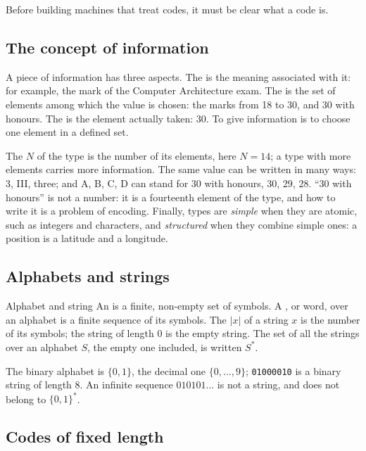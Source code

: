 Before building machines that treat codes, it must be clear what a code is.

\subsection{The concept of information}

A piece of information has three aspects. The  is the meaning
associated with it: for example, the mark of the Computer Architecture exam.
The  is the set of elements among which the value is chosen: the
marks from 18 to 30, and 30 with honours. The  is the element
actually taken: 30. To give information is to choose one element in a defined
set.

The  $N$ of the type is the number of its elements, here
$N=14$; a type with more elements carries more information. The same value
can be written in many ways: 3, III, three; and A, B, C, D can stand for 30
with honours, 30, 29, 28. ``30 with honours'' is not a number: it is a
fourteenth element of the type, and how to write it is a problem of encoding.
Finally, types are \emph{simple} when they are atomic, such as integers and
characters, and \emph{structured} when they combine simple ones: a position is
a latitude and a longitude.

\subsection{Alphabets and strings}

\begin{definition}{Alphabet and string}
An  is a finite, non-empty set of symbols. A , or
word, over an alphabet is a finite sequence of its symbols. The
 $|x|$ of a string $x$ is the number of its symbols; the string
of length 0 is the empty string. The set of all the strings over an alphabet
$S$, the empty one included, is written $S^{*}$.
\end{definition}

The binary alphabet is $\{0,1\}$, the decimal one $\{0,\dots,9\}$;
\texttt{01000010} is a binary string of length 8. An infinite sequence
$010101\ldots$ is not a string, and does not belong to $\{0,1\}^{*}$.

\subsection{Codes of fixed length}

